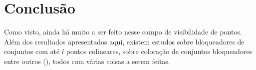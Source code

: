 \chapter {Conclusão}
Como visto, ainda há muito a ser feito nesse campo de visibilidade de pontos. Além dos resultados apresentados aqui, existem estudos sobre bloqueadores de conjuntos com até $l$ pontos colineares, sobre coloração de conjuntos bloqueadores entre outros (\cite{visblock}), todos com várias coisas a serem feitas.


